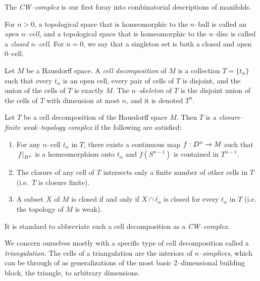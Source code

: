 The \emph{CW--complex} is our first foray into combinatorial descriptions of manifolds.

\begin{defn}
	For $n>0$, a topological space that is homeomorphic to the $n$--ball is called an \emph{open $n$--cell}, and a topological space that is homeomorphic to the $n$--disc is called a \emph{closed $n$--cell}.
	For $n=0$, we say that a singleton set is both a closed and open 0--cell.
	
	Let $M$ be a Hausdorff space.
	A \emph{cell decomposition} of $M$ is a collection $T=\{t_\alpha\}$ such that every $t_\alpha$ is an open cell, every pair of cells of $T$ is disjoint, and the union of the cells of $T$ is exactly $M$.
	The \emph{$n$--skeleton} of $T$ is the disjoint union of the cells of $T$ with dimension at most $n$, and it is denoted $T^n$.
	
	Let $T$ be a cell decomposition of the Hausdorff space $M$.
	Then $T$ is a \emph{closure--finite weak--topology complex} if the following are satisfied: 
	\begin{enumerate}
		\item For any $n$--cell $t_\alpha$ in $T$, there exists a continuous map $f:D^n\to M$ such that $\left.f\right|_{B^n}$ is a homeomorphism onto $t_\alpha$ and $f(S^{n-1})$ is contained in $T^{n-1}$.
		\item The closure of any cell of $T$ intersects only a finite number of other cells in $T$ (i.e.\ $T$ is closure finite).
		\item A subset $X$ of $M$ is closed if and only if $X\cap \overline{t_\alpha}$ is closed for every $t_\alpha$ in $T$ (i.e. the topology of $M$ is weak).		
	\end{enumerate}
	It is standard to abbreviate such a cell decomposition as a \emph{CW--complex}.	
\end{defn}

We concern ourselves mostly with a specific type of cell decomposition called a \emph{triangulation.}
The cells of a triangulation are the interiors of \emph{$n$--simplices}, which can be through of as generalizations of the most basic 2--dimensional building block, the triangle, to arbitrary dimensions.

